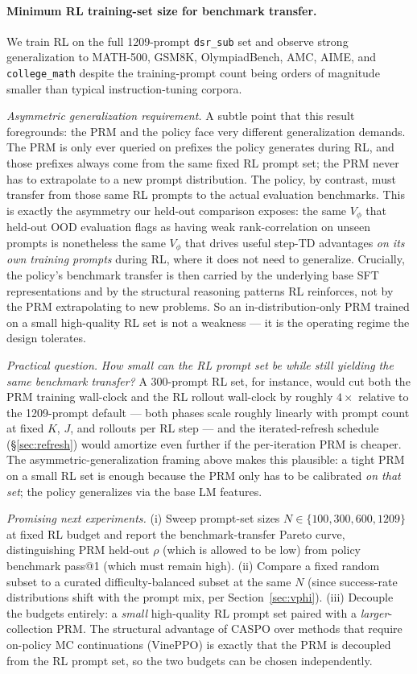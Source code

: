 \documentclass[11pt]{article}
\newcommand{\caspo}{\textsc{CASPO}}
\newcommand{\vineppo}{VinePPO}
\begin{document}
\paragraph{Minimum RL training-set size for benchmark transfer.}
We train RL on the full 1209-prompt \texttt{dsr\_sub} set and observe
strong generalization to MATH-500, GSM8K, OlympiadBench, AMC, AIME, and
\texttt{college\_math} despite the training-prompt count being orders
of magnitude smaller than typical instruction-tuning corpora.

\emph{Asymmetric generalization requirement.} A subtle point that this
result foregrounds: the PRM and the policy face very different
generalization demands. The PRM is only ever queried on prefixes the
policy generates during RL, and those prefixes always come from the
same fixed RL prompt set; the PRM never has to extrapolate to a new
prompt distribution. The policy, by contrast, must transfer from those
same RL prompts to the actual evaluation benchmarks. This is exactly
the asymmetry our held-out comparison exposes: the same $V_\phi$ that
held-out OOD evaluation flags as having weak rank-correlation on
unseen prompts is nonetheless the same $V_\phi$ that drives
useful step-TD advantages \emph{on its own training prompts} during
RL, where it does not need to generalize. Crucially, the policy's
benchmark transfer is then carried by the underlying base SFT
representations and by the structural reasoning patterns RL reinforces,
not by the PRM extrapolating to new problems. So an in-distribution-only
PRM trained on a small high-quality RL set is not a weakness --- it is
the operating regime the design tolerates.

\emph{Practical question.} \emph{How small can the RL prompt set be
while still yielding the same benchmark transfer?} A 300-prompt RL set,
for instance, would cut both the PRM training wall-clock and the RL
rollout wall-clock by roughly $4{\times}$ relative to the 1209-prompt
default --- both phases scale roughly linearly with prompt count at
fixed $K$, $J$, and rollouts per RL step --- and the iterated-refresh
schedule (\S\ref{sec:refresh}) would amortize even further if the
per-iteration PRM is cheaper. The asymmetric-generalization framing
above makes this plausible: a tight PRM on a small RL set is enough
because the PRM only has to be calibrated \emph{on that set}; the
policy generalizes via the base LM features.

\emph{Promising next experiments.} (i) Sweep prompt-set sizes
$N \in \{100, 300, 600, 1209\}$ at fixed RL budget and report
the benchmark-transfer Pareto curve, distinguishing PRM held-out
$\rho$ (which is allowed to be low) from policy benchmark pass@1 (which
must remain high). (ii) Compare a fixed random subset to a curated
difficulty-balanced subset at the same $N$ (since success-rate
distributions shift with the prompt mix, per Section~\ref{sec:vphi}).
(iii) Decouple the budgets entirely: a \emph{small} high-quality RL
prompt set paired with a \emph{larger}-collection PRM. The structural
advantage of \caspo{} over methods that require on-policy MC
continuations (\vineppo{}) is exactly that the PRM is decoupled from
the RL prompt set, so the two budgets can be chosen independently.
\end{document}
